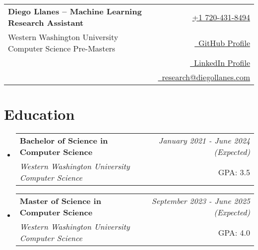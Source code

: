 \documentclass[a4paper,11pt]{article}
\makeatletter
\newcommand{\resumeSubheading}[4]{
\vspace{0.5mm}\item
    \begin{tabular*}{0.98\textwidth}[t]{l@{\extracolsep{\fill}}r}
        \textbf{#1} & \textit{\footnotesize{#4}} \\
        \textit{\footnotesize{#3}} &  \footnotesize{#2}\\
    \end{tabular*}
    \vspace{-2.4mm}
}
\newcommand{\resumeSubHeadingListStart}{\begin{itemize}[leftmargin=*,labelsep=0mm]}
\newcommand{\resumeSubHeadingListEnd}{\end{itemize}\vspace{2mm}}
\newcommand{\name}{Diego Llanes -- Machine Learning Research Assistant} %
\newcommand{\phone}{720-431-8494} %
\newcommand{\emaila}{research@diegollanes.com} %
\makeatother
\begin{document}
\selectfont

{
\begin{tabularx}{\linewidth}{L r} \\
  \textbf{\LARGE \name} & {\raisebox{0.0\height}{\footnotesize \faPhone}\ \href{tel:17204318494}{+1 \phone}}\\
  Western Washington University Computer Science Pre-Masters & \href{https://github.com/Diego-Llanes}{\raisebox{0.0\height}{\footnotesize \faGithub}\ {GitHub Profile}} \\  
  {} & \href{https://www.linkedin.com/in/diego-llanes-ai/}{\raisebox{0.0\height}{\footnotesize \faLinkedin}\ {LinkedIn Profile}} \\
  {} & \href{mailto:\emaila}{\raisebox{0.0\height}{\footnotesize \faEnvelope}\ {\emaila}} \\
\end{tabularx}
}

\vspace{-9.0mm}

\section{\textbf{Education}}
  \resumeSubHeadingListStart
    \resumeSubheading
      { Bachelor of Science in Computer Science}{GPA: 3.5}
      {Western Washington University Computer Science}{January 2021 - June 2024 (Expected)}
      
    \resumeSubheading
      { Master of Science in Computer Science}{GPA: 4.0}
      {Western Washington University Computer Science}{September 2023 - June 2025 (Expected)}
  \resumeSubHeadingListEnd
\vspace{-5.5mm}
%

\end{document}
